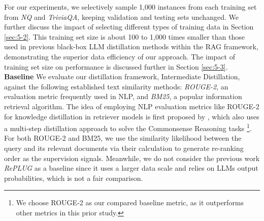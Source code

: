 For our experiments, we selectively sample 1,000 instances from each training set from \textit{NQ} and \textit{TriviaQA}, keeping validation and testing sets unchanged.
We further discuss the impact of selecting different types of training data in Section \ref{sec:5-2}.
This training set size is about 100 to 1,000 times smaller than those used in previous black-box LLM distillation methods within the RAG framework, demonstrating the superior data efficiency of our approach. 
The impact of training set size on performance is discussed further in Section \ref{sec:5-3}. \\
\textbf{Baseline} We evaluate our distillation framework, Intermediate Distillation, against the following established text similarity methods: \textit{ROUGE-2}, an evaluation metric frequently used in NLP, and \textit{BM25}, a popular information retrieval algorithm.
The idea of employing NLP evaluation metrics like ROUGE-2 for knowledge distillation in retriever models is first proposed by \cite{he2022metric}, which also uses a multi-step distillation approach to solve the Commonsense Reasoning tasks \footnote{We choose ROUGE-2 as our compared baseline metric, as it outperforms other metrics in this prior study.}.
For both ROUGE-2 and BM25, we use the similarity likelihood between the query and its relevant documents via their calculation to generate re-ranking order as the supervision signals.
Meanwhile, we do not consider the previous work \textit{RePLUG} \cite{shi2023replug} as a baseline since it uses a larger data scale and relies on LLMs output probabilities, which is not a fair comparison.

